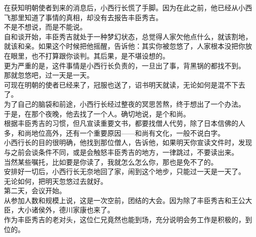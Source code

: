 \begin{multicols}{\theparacolNo}
在获知明朝使者到来的消息后，小西行长慌了手脚。因为在此之前，他已经从小西飞那里知道了事情的真相，却没有去报告丰臣秀吉。\\

不是不想说，而是不能说。\\

自和谈开始，丰臣秀吉就处于一种梦幻状态，总觉得人家欠他点什么，就该割地，就该和亲。如果这个时候把他摇醒，告诉他：其实你被忽悠了，人家根本没把你放在眼里，也不打算跟你谈判。其后果，是不堪设想的。\\

更为严重的是，这件事情是小西行长负责的，一旦出了事，背黑锅的都找不到。\\

那就忽悠吧，过一天是一天。\\

可现在明朝的使者已经来了，冠服也送了，诏书明天就读，无论如何是混不下去了。\\

为了自己的脑袋和前途，小西行长经过整夜的冥思苦熬，终于想出了一个办法。\\

于是，在那个夜晚，他去找了一个人。确切地说，是个和尚。\\

根据丰臣秀吉的习惯，但凡宣读重要文书，都要找僧人代劳，除了日本信佛的人多，和尚地位高外，还有一个重要原因——和尚有文化，一般不说白字。\\

小西行长的目的很明确，他找到那位僧人，告诉他，如果明天你宣读文件时，发现与之前会谈条件不同，或是会触怒丰臣秀吉的地方，一律跳过，不要读出来。\\

当然某些嘱托，比如要是你读了，我就怎么怎么你，那也是免不了的。\\

安排好一切后，小西行长无奈地回了家，闹到这个地步，只能过一天是一天了。\\

无论如何，把明天忽悠过去就好。\\

第二天，会议开始。\\

从参加人数和规模上说，这是一次空前，团结的大会。因为除了丰臣秀吉和王公大臣，大小诸侯外，德川家康也来了。\\

作为丰臣秀吉的老对头，这位仁兄竟然也能到场，充分说明会务工作是积极的，到位的。\\


\end{multicols}
